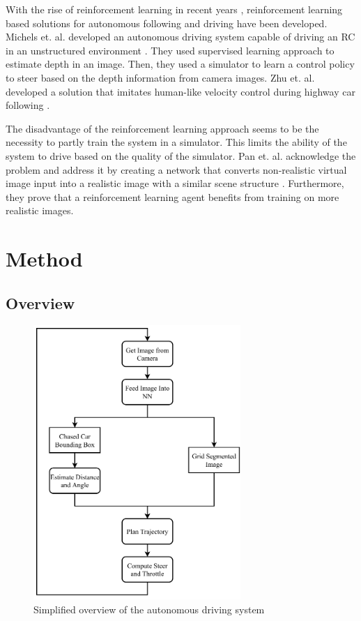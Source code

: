 \documentclass{ctuthesis/ctuthesis}
\begin{document}
With the rise of reinforcement learning in recent years \cite{alphago}\cite{deepstack}\cite{alphastar}, reinforcement learning based solutions for autonomous following and driving have been developed. Michels et. al. developed an autonomous driving system capable of driving an RC in an unstructured environment \cite{RL_autonomous_driving}. They used supervised learning approach to estimate depth in an image. Then, they used a simulator to learn a control policy to steer based on the depth information from camera images. Zhu et. al. developed a solution that imitates human-like velocity control during highway car following \cite{RL_humanlike}\cite{RL_velocity}.

The disadvantage of the reinforcement learning approach seems to be the necessity to partly train the system in a simulator. This limits the ability of the system to drive based on the quality of the simulator. Pan et. al. acknowledge the problem and address it by creating a network that converts non-realistic virtual image input into a realistic image with a similar scene structure \cite{synthetic_images}. Furthermore, they prove that a reinforcement learning agent benefits from training on more realistic images.

\chapter{Method}\label{s:method}
\section{Overview}
\begin{figure}[]
    \centering
    \includegraphics[width=0.7\textwidth]{images/bachelor_diagram.pdf}
    \caption{Simplified overview of the autonomous driving system}\label{f:overview}
\end{figure}
\end{document}
